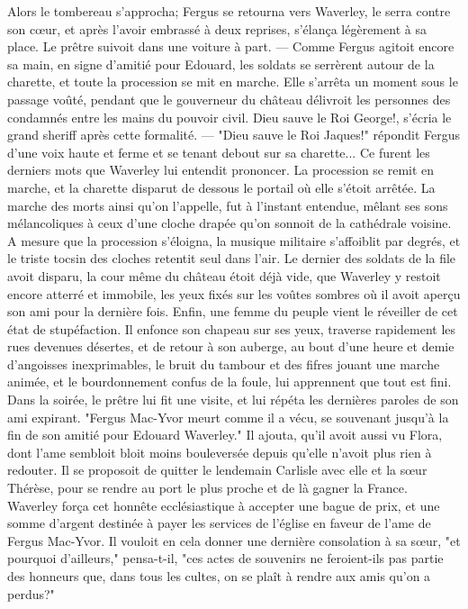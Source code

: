 Alors le tombereau s’approcha; Fergus se retourna vers Waverley, le serra contre son cœur, et après l’avoir embrassé à deux reprises, s’élança légèrement à sa place. Le prêtre suivoit dans une voiture à part. — Comme Fergus agitoit encore sa main, en signe d’amitié pour Edouard, les soldats se serrèrent autour de la charette, et toute la procession se mit en marche. Elle s’arrêta un moment sous le passage voûté, pendant que le gouverneur du château délivroit les personnes des condamnés entre les mains du pouvoir civil. Dieu sauve le Roi George!, s’écria le grand sheriff après cette formalité. — "Dieu sauve le Roi Jaques!" répondit Fergus d’une voix haute et ferme et se tenant debout sur sa charette... Ce furent les derniers mots que Waverley lui entendit prononcer.
La procession se remit en marche, et la charette disparut de dessous le portail où\setcounter{page}{392} elle s'étoit arrêtée. La marche des morts ainsi qu'on l'appelle, fut à l'instant entendue, mêlant ses sons mélancoliques à ceux d'une cloche drapée qu'on sonnoit de la cathédrale voisine. A mesure que la procession s'éloigna, la musique militaire s'affoiblit par degrés, et le triste tocsin des cloches retentit seul dans l'air.
Le dernier des soldats de la file avoit disparu, la cour même du château étoit déjà vide, que Waverley y restoit encore atterré et immobile, les yeux fixés sur les voûtes sombres où il avoit aperçu son ami pour la dernière fois. Enfin, une femme du peuple vient le réveiller de cet état de stupéfaction. Il enfonce son chapeau sur ses yeux, traverse rapidement les rues devenues désertes, et de retour à son auberge, au bout d'une heure et demie d'angoisses inexprimables, le bruit du tambour et des fifres jouant une marche animée, et le bourdonnement confus de la foule, lui apprennent que tout est fini.
Dans la soirée, le prêtre lui fit une visite, et lui répéta les dernières paroles de son ami expirant. "Fergus Mac-Yvor meurt comme il a vécu, se souvenant jusqu'à la fin de son amitié pour Edouard Waverley." Il ajouta, qu'il avoit aussi vu Flora, dont l'ame sembloit\setcounter{page}{393} bloit moins bouleversée depuis qu'elle n'avoit plus rien à redouter. Il se proposoit de quitter le lendemain Carlisle avec elle et la sœur Thérèse, pour se rendre au port le plus proche et de là gagner la France. Waverley força cet honnête ecclésiastique à accepter une bague de prix, et une somme d'argent destinée à payer les services de l'église en faveur de l'ame de Fergus Mac-Yvor. Il vouloit en cela donner une dernière consolation à sa sœur, "et pourquoi d'ailleurs," pensa-t-il, "ces actes de souvenirs ne feroient-ils pas partie des honneurs que, dans tous les cultes, on se plaît à rendre aux amis qu'on a perdus?"
